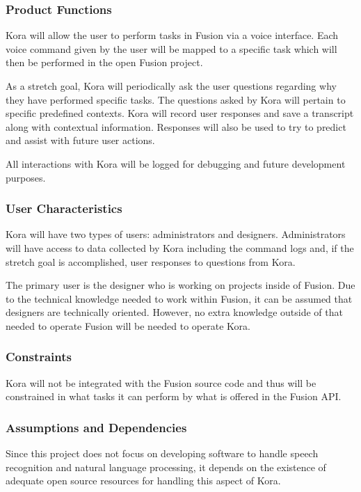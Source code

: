 \documentclass[onecolumn, draftclsnofoot,10pt, compsoc]{IEEEtran}
\def \botname{Kora\xspace}
\begin{document}
	\subsubsection{Product Functions}
	\botname will allow the user to perform tasks in Fusion via a voice interface.
	Each voice command given by the user will be mapped to a specific task which will then be performed in the open Fusion project.

	As a stretch goal, \botname will periodically ask the user questions regarding why they have performed specific tasks.
	The questions asked by \botname will pertain to specific predefined contexts.
	\botname will record user responses and save a transcript along with contextual information.
	Responses will also be used to try to predict and assist with future user actions.

	All interactions with \botname will be logged for debugging and future development purposes.

	\subsubsection{User Characteristics}
	\botname will have two types of users: administrators and designers.
	Administrators will have access to data collected by \botname including the command logs and, if the stretch goal is accomplished, user responses to questions from \botname.

	The primary user is the designer who is working on projects inside of Fusion.
	Due to the technical knowledge needed to work within Fusion, it can be assumed that designers are technically oriented.
	However, no extra knowledge outside of that needed to operate Fusion will be needed to operate \botname.

	\subsubsection{Constraints}
	\botname will not be integrated with the Fusion source code and thus will be constrained in what tasks it can perform by what is offered in the Fusion API.

	\subsubsection{Assumptions and Dependencies}
	Since this project does not focus on developing software to handle speech recognition and natural language processing, it depends on the existence of adequate open source resources for handling this aspect of \botname.
\end{document}
